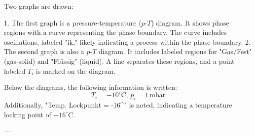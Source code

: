 Two graphs are drawn:  

1. The first graph is a pressure-temperature (\( p \)-\( T \)) diagram. It shows phase regions with a curve representing the phase boundary. The curve includes oscillations, labeled "ik," likely indicating a process within the phase boundary.  
2. The second graph is also a \( p \)-\( T \) diagram. It includes labeled regions for "Gas/Fest" (gas-solid) and "Flüssig" (liquid). A line separates these regions, and a point labeled \( T_i \) is marked on the diagram.  

Below the diagrams, the following information is written:  
\[
T_i = -10^\circ\text{C}, \, p_i = 1 \, \text{mbar}
\]  
Additionally, "Temp. Lockpunkt = -16^\circ{}" is noted, indicating a temperature locking point of \(-16^\circ\text{C}\).  

---